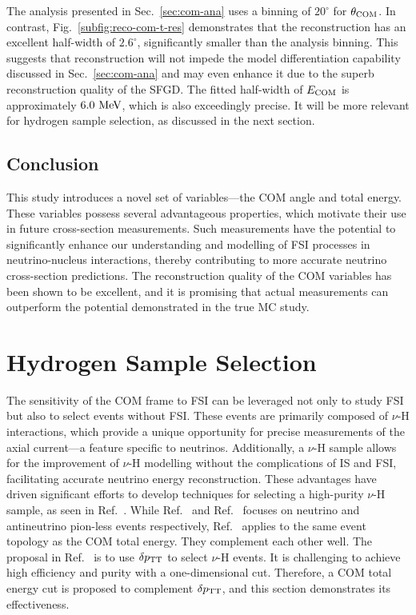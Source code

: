      The analysis presented in Sec.~\ref{sec:com-ana} uses a binning of $20^\circ$ for $\theta_{\textrm{COM}}$. In contrast, Fig.~\ref{subfig:reco-com-t-res} demonstrates that the reconstruction has an excellent half-width of $2.6^\circ$, significantly smaller than the analysis binning. This suggests that reconstruction will not impede the model differentiation capability discussed in Sec.~\ref{sec:com-ana} and may even enhance it due to the superb reconstruction quality of the SFGD. The fitted half-width of $E_{\textrm{COM}}$ is approximately $6.0~\textrm{MeV}$, which is also exceedingly precise. It will be more relevant for hydrogen sample selection, as discussed in the next section. 

     \subsection{Conclusion}
     This study introduces a novel set of variables—the COM angle and total energy. These variables possess several advantageous properties, which motivate their use in future cross-section measurements. Such measurements have the potential to significantly enhance our understanding and modelling of FSI processes in neutrino-nucleus interactions, thereby contributing to more accurate neutrino cross-section predictions. The reconstruction quality of the COM variables has been shown to be excellent, and it is promising that actual measurements can outperform the potential demonstrated in the true MC study.

\section{Hydrogen Sample Selection}
\label{sec:mc-hydrogen}
The sensitivity of the COM frame to FSI can be leveraged not only to study FSI but also to select events without FSI. 
These events are primarily composed of $\nu$-H interactions, which provide a unique opportunity for precise measurements of the axial current—a feature specific to neutrinos. 
Additionally, a $\nu$-H sample allows for the improvement of $\nu$-H modelling without the complications of IS and FSI, facilitating accurate neutrino energy reconstruction. 
These advantages have driven significant efforts to develop techniques for selecting a high-purity $\nu$-H sample, as seen in Ref.~\cite{Lu:2015hea,MINERvA:2023avz,Baudis:2023tma}.
While Ref.~\cite{Baudis:2023tma} and Ref.~\cite{MINERvA:2023avz} focuses on neutrino and antineutrino pion-less events respectively, Ref.~\cite{Lu:2015hea} applies to the same event topology as the COM total energy. 
They complement each other well.
The proposal in Ref.~\cite{Lu:2015hea} is to use $\delta p_\textrm{TT}$ to select $\nu$-H events.
It is challenging to achieve high efficiency and purity with a one-dimensional cut. 
Therefore, a COM total energy cut is proposed to complement $\delta p_\textrm{TT}$, and this section demonstrates its effectiveness.

